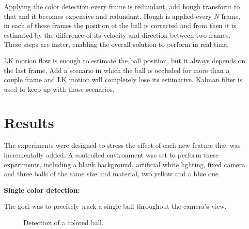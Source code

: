 \documentclass[10pt,twocolumn,letterpaper]{article}
\begin{document}
  Applying the color detection every frame is redundant, add hough transform to
  that and it becomes expensive and redundant. Hough is applied every $N$ frame,
  in each of these frames the position of the ball is corrected and from then it
  is estimated by the difference of its velocity and direction between two
  frames. These steps are faster, enabling the overall solution to perform in
  real time.

  LK motion flow is enough to estimate the ball position, but it always depends
  on the last frame. Add a scenario in which the ball is occluded for more than
  a couple frame and LK motion will completely lose its estimative. Kalman
  filter is used to keep up with those scenarios.

  \section{Results}\label{sec:result}

  The experiments were designed to stress the effect of each new feature that
  was incrementally added. A controlled environment was set to perform these
  experiments, including a blank background, artificial white lighting, fixed
  camera and three balls of the same size and material, two yellow and a blue
  one.

  \bigbreak{}
  \textbf{Single color detection:}
  \bigbreak{}

  The goal was to precisely track a single ball throughout the camera's view.

  \begin{figure}[!h]
    \centering
    \setlength{\fboxsep}{1pt}
    \setlength{\fboxrule}{1pt}
    \caption{Detection of a colored ball.}\label{fig:single_color}
  \end{figure}
\end{document}
